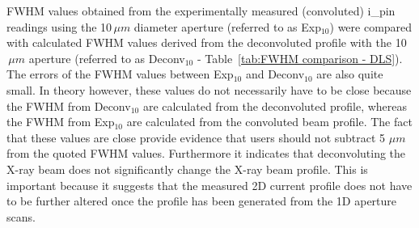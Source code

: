 FWHM values obtained from the experimentally measured (convoluted) i\_pin readings using the 10$\,\mu m$ diameter aperture (referred to as Exp$_{\text{10}}$) were compared with calculated FWHM values derived from the deconvoluted profile with the 10$\,\mu m$ aperture (referred to as Deconv$_{\text{10}}$ - Table~\ref{tab:FWHM comparison - DLS}).
The errors of the FWHM values between Exp$_{\text{10}}$ and Deconv$_{\text{10}}$ are also quite small.
In theory however, these values do not necessarily have to be close because the FWHM from Deconv$_{\text{10}}$ are calculated from the deconvoluted profile, whereas the FWHM from Exp$_{\text{10}}$  are calculated from the convoluted beam profile.
The fact that these values are close provide evidence that users should not subtract 5 $\mu m$ from the quoted FWHM values.
Furthermore it indicates that deconvoluting the X-ray beam does not significantly change the X-ray beam profile.
This is important because it suggests that the measured 2D current profile does not have to be further altered once the profile has been generated from the 1D aperture scans.
